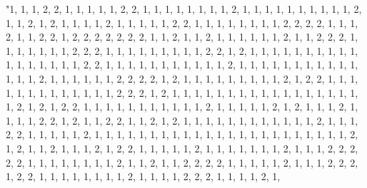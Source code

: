 \documentclass[
]{article}
\begin{document}
\begin{Schunk}
\begin{Soutput}
                                                                                                                                                                                                                                                                                                                                                                                                                                                                                                                                                                                                                                                                                                                                                                                                                                                                                                                                                                                                                                                                                                                                                                                                                                                                                                                                                                                                                                                                                                                                                                                                                                                                                                                                                                                                                                                                                                                                                                                                                                                                                                                                                            "1, 1, 1, 2, 2, 1, 1, 1, 1, 1, 2, 2, 1, 1, 1, 1, 1, 1, 1, 1, 2, 1, 1, 1, 1, 1, 1, 1, 1, 1, 1, 2, 1, 1, 2, 1, 2, 1, 1, 1, 1, 2, 1, 1, 1, 1, 1, 2, 2, 1, 1, 1, 1, 1, 1, 1, 1, 2, 2, 2, 2, 1, 1, 1, 2, 1, 1, 2, 2, 1, 2, 2, 2, 2, 2, 2, 2, 1, 1, 2, 1, 1, 2, 1, 1, 1, 1, 1, 1, 2, 1, 1, 2, 2, 2, 1, 1, 1, 1, 1, 1, 1, 2, 2, 2, 1, 1, 1, 1, 1, 1, 1, 1, 1, 2, 2, 1, 2, 1, 1, 1, 1, 1, 1, 1, 1, 1, 1, 1, 1, 1, 1, 1, 1, 1, 2, 2, 1, 1, 1, 1, 1, 1, 1, 1, 1, 1, 1, 2, 1, 1, 1, 1, 1, 1, 1, 1, 1, 1, 1, 1, 1, 1, 2, 1, 1, 1, 1, 1, 1, 2, 2, 2, 2, 1, 2, 1, 1, 1, 1, 1, 1, 1, 1, 1, 2, 1, 2, 2, 1, 1, 1, 1, 1, 1, 1, 1, 1, 1, 1, 1, 1, 2, 2, 2, 1, 2, 1, 1, 1, 1, 1, 1, 1, 1, 1, 1, 1, 1, 1, 1, 1, 1, 1, 1, 2, 1, 2, 1, 2, 2, 1, 1, 1, 1, 1, 1, 1, 1, 1, 1, 1, 2, 1, 1, 1, 1, 1, 2, 1, 2, 1, 1, 1, 2, 1, 1, 1, 1, 2, 2, 1, 2, 1, 1, 2, 2, 1, 1, 2, 1, 2, 1, 1, 1, 1, 1, 1, 1, 1, 1, 1, 1, 1, 2, 1, 1, 1, 2, 2, 1, 1, 1, 1, 1, 2, 1, 1, 1, 1, 1, 1, 1, 1, 1, 1, 1, 1, 1, 1, 1, 1, 1, 1, 1, 1, 1, 1, 1, 2, 1, 2, 1, 1, 2, 1, 1, 1, 2, 1, 2, 2, 1, 1, 1, 1, 1, 2, 1, 1, 1, 1, 1, 1, 1, 2, 1, 1, 1, 2, 2, 2, 2, 2, 1, 1, 1, 1, 1, 1, 1, 1, 2, 1, 1, 2, 1, 1, 2, 2, 2, 2, 1, 1, 1, 1, 1, 2, 1, 1, 1, 2, 2, 2, 1, 2, 2, 1, 1, 1, 1, 1, 1, 1, 1, 2, 1, 1, 1, 1, 2, 2, 2, 1, 1, 1, 1, 2, 1, 
\end{Soutput}
\end{Schunk}
\end{document}
